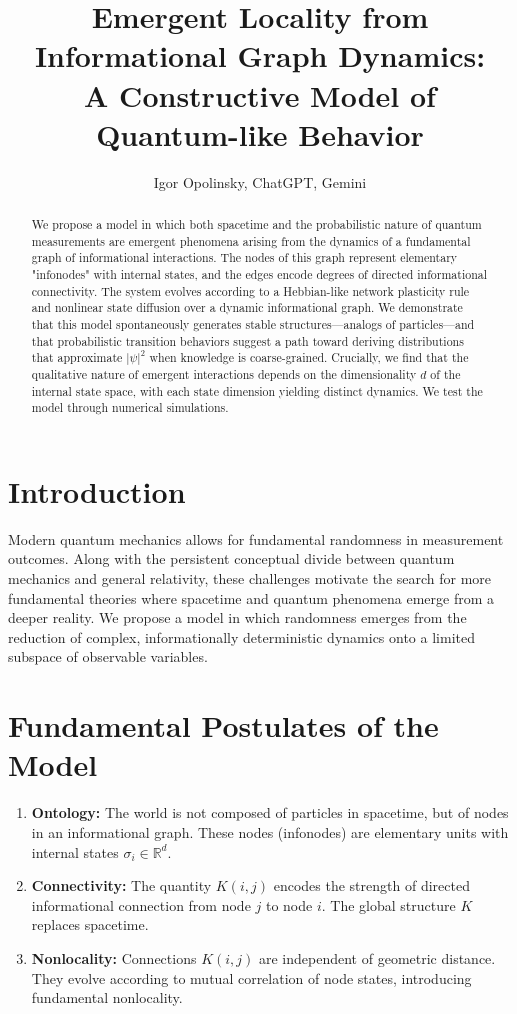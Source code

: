 \documentclass[12pt]{article}
\title{Emergent Locality from Informational Graph Dynamics:\\A Constructive Model of Quantum-like Behavior}
\author{Igor Opolinsky, ChatGPT, Gemini}
\date{}
\begin{document}
\maketitle

\begin{abstract}
We propose a model in which both spacetime and the probabilistic nature of quantum measurements are emergent phenomena arising from the dynamics of a fundamental graph of informational interactions. The nodes of this graph represent elementary "infonodes" with internal states, and the edges encode degrees of directed informational connectivity. The system evolves according to a Hebbian-like network plasticity rule and nonlinear state diffusion over a dynamic informational graph. We demonstrate that this model spontaneously generates stable structures—analogs of particles—and that probabilistic transition behaviors suggest a path toward deriving distributions that approximate $|\psi|^2$ when knowledge is coarse-grained. Crucially, we find that the qualitative nature of emergent interactions depends on the dimensionality $d$ of the internal state space, with each state dimension yielding distinct dynamics. We test the model through numerical simulations.
\end{abstract}

\section{Introduction}

Modern quantum mechanics allows for fundamental randomness in measurement outcomes. Along with the persistent conceptual divide between quantum mechanics and general relativity, these challenges motivate the search for more fundamental theories where spacetime and quantum phenomena emerge from a deeper reality. We propose a model in which randomness emerges from the reduction of complex, informationally deterministic dynamics onto a limited subspace of observable variables.

\section{Fundamental Postulates of the Model}

\begin{enumerate}
    \item \textbf{Ontology:} The world is not composed of particles in spacetime, but of nodes in an informational graph. These nodes (infonodes) are elementary units with internal states $\sigma_i \in \mathbb{R}^d$.
    \item \textbf{Connectivity:} The quantity $K(i,j)$ encodes the strength of directed informational connection from node $j$ to node $i$. The global structure $K$ replaces spacetime.
    \item \textbf{Nonlocality:} Connections $K(i,j)$ are independent of geometric distance. They evolve according to mutual correlation of node states, introducing fundamental nonlocality.
\end{enumerate}
\end{document}
